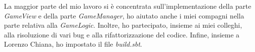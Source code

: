 La maggior parte del mio lavoro si è concentrata sull'implementazione della parte \textit{GameView} e della parte \textit{GameManager}, ho aiutato anche i miei compagni nella parte relativa alla \textit{GameLogic}. Inoltre, ho partecipato, insieme ai miei colleghi, alla risoluzione di vari bug e alla rifattorizzazione del codice.
Infine, insieme a Lorenzo Chiana, ho impostato il file \textit{build.sbt}.

